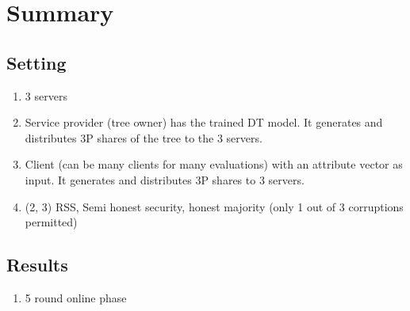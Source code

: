 
\clearpage
{}

%
\setcounter{section}{0} %

\section{Summary}

\subsection{Setting}
\begin{enumerate}
    \item 3 servers
    \item Service provider (tree owner) has the trained DT model. It generates and distributes 3P shares of the tree to the 3 servers.
    \item Client (can be many clients for many evaluations) with an attribute vector as input. It generates and distributes 3P shares to 3 servers.
    \item (2, 3) RSS, Semi honest security, honest majority (only 1 out of 3 corruptions permitted)
\end{enumerate}

\subsection{Results}
\begin{enumerate}
    \item 5 round online phase
\end{enumerate}

